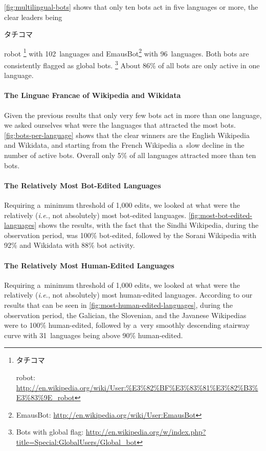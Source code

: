 \documentclass{sig-alternate}
\newcommand{\inlinelistingsize}{\fontsize{8pt}{11pt}}
\let\oldurl\url
\renewcommand{\url}[1]{\inlinelistingsize\oldurl{#1}}
\begin{document}
\autoref{fig:multilingual-bots} shows that only ten bots
act in five languages or more, the clear leaders
being \begin{CJK}{UTF8}{min}タチコマ\end{CJK} robot%
\footnote{\begin{CJK}{UTF8}{min}タチコマ\end{CJK} robot:
\url{http://en.wikipedia.org/wiki/User:\%E3\%82\%BF\%E3\%83\%81\%E3\%82\%B3\%E3\%83\%9E_robot}} with 102~languages and
EmausBot\footnote{EmausBot:
\url{http://en.wikipedia.org/wiki/User:EmausBot}}
with 96~languages.
Both bots are consistently flagged as global bots.%
\footnote{Bots with global flag: \url{http://en.wikipedia.org/w/index.php?title=Special:GlobalUsers/Global_bot}}
About 86\% of all bots are only active in one language.

\paragraph{The Linguae Francae of Wikipedia and Wikidata}

Given the previous results that only very few bots
act in more than one language, we asked ourselves
what were the languages that attracted the most bots.
\autoref{fig:bots-per-language} shows that the clear winners
are the English Wikipedia and Wikidata,
and starting from the French Wikipedia a~slow decline
in the number of active bots.
Overall only 5\% of all languages attracted more than ten bots.

\paragraph{The Relatively Most Bot-Edited Languages}

Requiring a~minimum threshold of 1,000 edits,
we looked at what were the relatively
(\emph{i.e.}, not absolutely) most bot-edited languages.
\autoref{fig:most-bot-edited-languages} shows the results,
with the fact that the Sindhi Wikipedia,
during the observation period, was 100\% bot-edited,
followed by the Sorani Wikipedia with 92\%
and Wikidata with 88\% bot activity.

\paragraph{The Relatively Most Human-Edited Languages}

Requiring a~minimum threshold of 1,000 edits,
we looked at what were the relatively
(\emph{i.e.}, not absolutely) most human-edited languages.
According to our results that can be seen in \autoref{fig:most-human-edited-languages},
during the observation period,
the Galician, the Slovenian, and the Javanese Wikipedias
were to 100\% human-edited, followed by
a~very smoothly descending stairway curve
with 31~languages being above 90\% human-edited.
\end{document}
